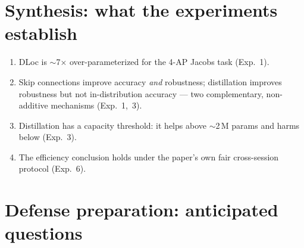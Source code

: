 \documentclass[11pt,a4paper]{article}
\begin{document}
\section{Synthesis: what the experiments establish}

\begin{enumerate}[nosep]
  \item DLoc is $\sim$7$\times$ over-parameterized for the 4-AP Jacobs task (Exp.~1).
  \item Skip connections improve accuracy \emph{and} robustness; distillation improves robustness
  but not in-distribution accuracy --- two complementary, non-additive mechanisms (Exp.~1,~3).
  \item Distillation has a capacity threshold: it helps above $\sim$2\,M params and harms below
  (Exp.~3).
  \item The efficiency conclusion holds under the paper's own fair cross-session protocol (Exp.~6).
\end{enumerate}

\section{Defense preparation: anticipated questions}
\end{document}
